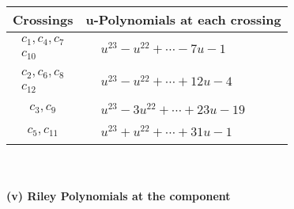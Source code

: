 \documentclass[1p]{elsarticle_modified}
\theoremstyle{definition}
\begin{document}
\begin{tabular}{m{50pt}|m{274pt}}
Crossings & \hspace{64pt}u-Polynomials at each crossing \\
\hline $$\begin{aligned}c_{1},c_{4},c_{7}\\c_{10}\end{aligned}$$&$\begin{aligned}
&u^{23}- u^{22}+\cdots-7 u-1
\end{aligned}$\\
\hline $$\begin{aligned}c_{2},c_{6},c_{8}\\c_{12}\end{aligned}$$&$\begin{aligned}
&u^{23}- u^{22}+\cdots+12 u-4
\end{aligned}$\\
\hline $$\begin{aligned}c_{3},c_{9}\end{aligned}$$&$\begin{aligned}
&u^{23}-3 u^{22}+\cdots+23 u-19
\end{aligned}$\\
\hline $$\begin{aligned}c_{5},c_{11}\end{aligned}$$&$\begin{aligned}
&u^{23}+u^{22}+\cdots+31 u-1
\end{aligned}$\\
\hline
\end{tabular}\\~\\
\newpage\renewcommand{\arraystretch}{1}
\flushleft \textbf{(v) Riley Polynomials at the component}\newline \\
\end{document}
